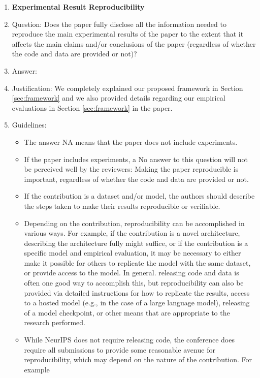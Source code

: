 \documentclass{article}
\begin{document}
\begin{enumerate}
    \item {\bf Experimental Result Reproducibility}
    \item[] Question: Does the paper fully disclose all the information needed to reproduce the main experimental results of the paper to the extent that it affects the main claims and/or conclusions of the paper (regardless of whether the code and data are provided or not)?
    \item[] Answer: \answerYes{} %
    \item[] Justification:
    We completely explained our proposed framework in Section \ref{sec:framework} and we also provided details regarding our empirical evaluations in Section \ref{sec:framework} in the paper. 
    \item[] Guidelines:
    \begin{itemize}
        \item The answer NA means that the paper does not include experiments.
        \item If the paper includes experiments, a No answer to this question will not be perceived well by the reviewers: Making the paper reproducible is important, regardless of whether the code and data are provided or not.
        \item If the contribution is a dataset and/or model, the authors should describe the steps taken to make their results reproducible or verifiable. 
        \item Depending on the contribution, reproducibility can be accomplished in various ways. For example, if the contribution is a novel architecture, describing the architecture fully might suffice, or if the contribution is a specific model and empirical evaluation, it may be necessary to either make it possible for others to replicate the model with the same dataset, or provide access to the model. In general. releasing code and data is often one good way to accomplish this, but reproducibility can also be provided via detailed instructions for how to replicate the results, access to a hosted model (e.g., in the case of a large language model), releasing of a model checkpoint, or other means that are appropriate to the research performed.
        \item While NeurIPS does not require releasing code, the conference does require all submissions to provide some reasonable avenue for reproducibility, which may depend on the nature of the contribution. For example
        \begin{enumerate}

\end{enumerate}
\end{itemize}
\end{enumerate}
\end{document}
